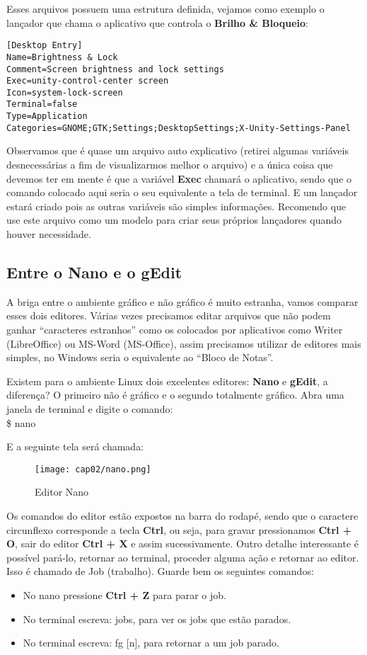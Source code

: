 Esses arquivos possuem uma estrutura definida, vejamos como exemplo o lançador que chama o aplicativo que controla o \textbf{Brilho \& Bloqueio}:
\begin{lstlisting}
[Desktop Entry]
Name=Brightness & Lock
Comment=Screen brightness and lock settings
Exec=unity-control-center screen
Icon=system-lock-screen
Terminal=false
Type=Application
Categories=GNOME;GTK;Settings;DesktopSettings;X-Unity-Settings-Panel
\end{lstlisting}

Observamos que é quase um arquivo auto explicativo (retirei algumas variáveis desnecessárias a fim de visualizarmos melhor o arquivo) e a única coisa que devemos ter em mente é que a variável \textbf{Exec} chamará o aplicativo, sendo que o comando colocado aqui seria o seu equivalente a tela de terminal. E um lançador estará criado pois as outras variáveis são simples informações. Recomendo que use este arquivo como um modelo para criar seus próprios lançadores quando houver necessidade.

\subsection{Entre o Nano e o gEdit}
A briga entre o ambiente gráfico e não gráfico é muito estranha, vamos comparar esses dois editores. Várias vezes precisamos editar arquivos que não podem ganhar ``caracteres estranhos'' como os colocados por aplicativos como Writer (LibreOffice) ou MS-Word (MS-Office), assim precisamos utilizar de editores mais simples, no Windows seria o equivalente ao ``Bloco de Notas''.

Existem para o ambiente Linux dois excelentes editores: \textbf{Nano} e \textbf{gEdit}, a diferença? O primeiro não é gráfico e o segundo totalmente gráfico. Abra uma janela de terminal e digite o comando: \\
{\ttfamily\$ nano}

E a seguinte tela será chamada:
\begin{figure}[H]
 \centering\texttt{[image: cap02/nano.png]}
 \caption{Editor Nano}
\end{figure}

Os comandos do editor estão expostos na barra do rodapé, sendo que o caractere circunflexo corresponde a tecla \textbf{Ctrl}, ou seja, para gravar pressionamos \textbf{Ctrl + O}, sair do editor \textbf{Ctrl + X} e assim sucessivamente. Outro detalhe interessante é possível pará-lo, retornar ao terminal, proceder alguma ação e retornar ao editor. Isso é chamado de Job (trabalho). Guarde bem os seguintes comandos: \vspace{-1em}
\begin{itemize}[noitemsep]
 \item No nano pressione \textbf{Ctrl + Z} para parar o job.
 \item No terminal escreva: {\ttfamily jobs}, para ver os jobs que estão parados. 
 \item No terminal escreva: {\ttfamily fg [n]}, para retornar a um job parado. 
\end{itemize}


